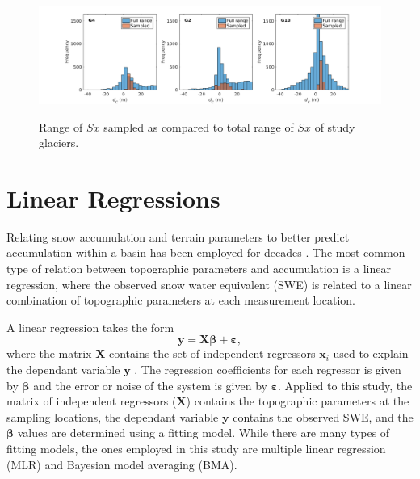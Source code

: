 \documentclass[12pt]{article}
\renewcommand{\vector}[1]{\mathbf{#1}}
\begin{document}
\begin{landscape}
\begin{figure}
	\centering
	\includegraphics[height = 0.4\textwidth]{SampledRangeTopo_Sx.png}\\
	\caption{Range of $Sx$ sampled as compared to total range of $Sx$ of study glaciers.}
	\label{sampledRange:Sx}
\end{figure}

\end{landscape}


\section{Linear Regressions}

Relating snow accumulation and terrain parameters to better predict accumulation within a basin has been employed for decades \citep[e.g.][]{Woo1978, Molotch2005, McGrath2015}. The most common type of relation between topographic parameters and accumulation is a linear regression, where the observed snow water equivalent (SWE) is related to a linear combination of topographic parameters at each measurement location. 

A linear regression takes the form
\begin{equation}
\vector{y} = \vector{X} \bm{\beta} + \bm{\varepsilon},
\end{equation}
where the matrix $\vector{X}$ contains the set of independent regressors $\vector{x}_i$ used to explain the dependant variable $\vector{y}$ \citep{Davis1986}. The regression coefficients for each regressor is given by $\bm{\beta}$ and the error or noise of the system is given by $\bm{\varepsilon}$. Applied to this study, the matrix of independent regressors ($\vector{X}$) contains the topographic parameters at the sampling locations, the dependant variable $\vector{y}$ contains the observed SWE, and the $\bm{\beta}$ values are determined using a fitting model. While there are many types of fitting models, the ones employed in this study are multiple linear regression (MLR) and Bayesian model averaging (BMA).
\end{document}
